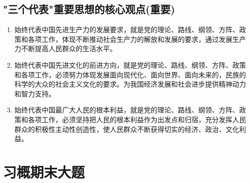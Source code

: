 \documentclass[12pt, a4paper, oneside]{ctexbook}
\begin{document}
\section{"三个代表"重要思想的核心观点(重要)}

\begin{enumerate}[label=（\arabic*）]
\item 始终代表中国先进生产力的发展要求，就是党的理论、路线、纲领、方阵、政策和各项工作，体现不断推动社会生产力的解放和发展的要求，通过发展生产力不断提高人民群众的生活水平。

\item 始终代表中国先进文化的前进方向，就是党的理论、路线、纲领、方阵、政策和各项工作，必须努力体现发展面向现代化、面向世界、面向未来的，民族的科学的大众的社会主义文化的要求。为我国经济发展和社会进步提供精神动力和智力支持。

\item 始终代表中国最广大人民的根本利益，就是党的理论、路线、纲领、方阵、政策和各项工作，必须坚持把人民的根本利益作为出发点和归宿，充分发挥人民群众的积极性主动性创造性，使人民群众不断获得切实的经济、政治、文化利益。
\end{enumerate}






\chapter{习概期末大题}
\end{document}
